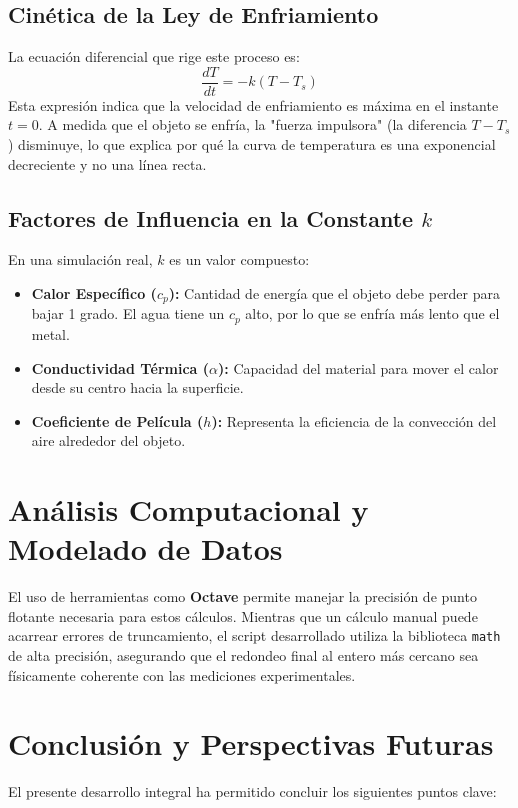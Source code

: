 \documentclass[12pt]{article}
\begin{document}
\subsection{Cinética de la Ley de Enfriamiento}
La ecuación diferencial que rige este proceso es:
\[ \frac{dT}{dt} = -k(T - T_s) \]
Esta expresión indica que la velocidad de enfriamiento es máxima en el instante $t=0$. A medida que el objeto se enfría, la "fuerza impulsora" (la diferencia $T - T_s$) disminuye, lo que explica por qué la curva de temperatura es una exponencial decreciente y no una línea recta. 

\subsection{Factores de Influencia en la Constante $k$}
En una simulación real, $k$ es un valor compuesto:
\begin{itemize}
    \item \textbf{Calor Específico ($c_p$):} Cantidad de energía que el objeto debe perder para bajar 1 grado. El agua tiene un $c_p$ alto, por lo que se enfría más lento que el metal.
    \item \textbf{Conductividad Térmica ($\alpha$):} Capacidad del material para mover el calor desde su centro hacia la superficie.
    \item \textbf{Coeficiente de Película ($h$):} Representa la eficiencia de la convección del aire alrededor del objeto.
\end{itemize}

\section{Análisis Computacional y Modelado de Datos}
El uso de herramientas como \textbf{Octave} permite manejar la precisión de punto flotante necesaria para estos cálculos. Mientras que un cálculo manual puede acarrear errores de truncamiento, el script desarrollado utiliza la biblioteca \texttt{math} de alta precisión, asegurando que el redondeo final al entero más cercano sea físicamente coherente con las mediciones experimentales.

\section{Conclusión y Perspectivas Futuras}

El presente desarrollo integral ha permitido concluir los siguientes puntos clave:
\end{document}
